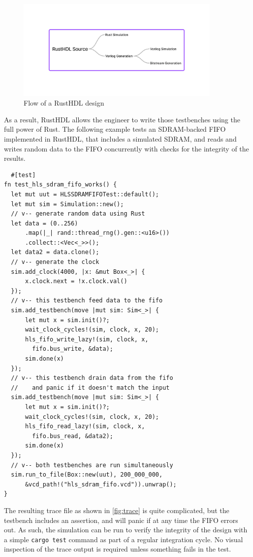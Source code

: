 \documentclass[conference]{IEEEtran}
\begin{document}
\begin{figure}[htbp]
  \centerline{\includegraphics[width=10cm]{flow.png}}
  \caption{Flow of a RustHDL design}
  \label{fig:flow}
\end{figure}


As a result, RustHDL allows the engineer to write those testbenches using 
the full power of Rust.  The following example tests an SDRAM-backed FIFO implemented in RustHDL, that
includes a simulated SDRAM, and reads and writes random data to the FIFO concurrently with checks for
the integrity of the results.

\begin{verbatim}
  #[test]
fn test_hls_sdram_fifo_works() {
  let mut uut = HLSSDRAMFIFOTest::default();
  let mut sim = Simulation::new();
  // v-- generate random data using Rust
  let data = (0..256)
      .map(|_| rand::thread_rng().gen::<u16>())
      .collect::<Vec<_>>();
  let data2 = data.clone();
  // v-- generate the clock
  sim.add_clock(4000, |x: &mut Box<_>| {
      x.clock.next = !x.clock.val()
  });
  // v-- this testbench feed data to the fifo
  sim.add_testbench(move |mut sim: Sim<_>| {
      let mut x = sim.init()?;
      wait_clock_cycles!(sim, clock, x, 20);
      hls_fifo_write_lazy!(sim, clock, x, 
        fifo.bus_write, &data);
      sim.done(x)
  });
  // v-- this testbench drain data from the fifo
  //    and panic if it doesn't match the input
  sim.add_testbench(move |mut sim: Sim<_>| {
      let mut x = sim.init()?;
      wait_clock_cycles!(sim, clock, x, 20);
      hls_fifo_read_lazy!(sim, clock, x, 
        fifo.bus_read, &data2);
      sim.done(x)
  });
  // v-- both testbenches are run simultaneously
  sim.run_to_file(Box::new(uut), 200_000_000, 
      &vcd_path!("hls_sdram_fifo.vcd")).unwrap();
}
\end{verbatim}

The resulting trace file as shown in \ref{fig:trace} is quite complicated, but 
the testbench includes an assertion, and will panic if at any time the FIFO errors out.  
As such, the simulation can be run to 
verify the integrity of the design with a simple \verb|cargo test| command as part of a 
regular integration cycle.  No visual inspection of the trace output is required unless 
something fails in the test.
\end{document}
